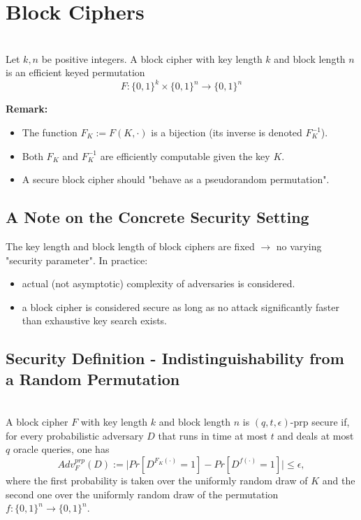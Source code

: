 

\chapter{Block Ciphers}


\begin{definition}\ \\
    Let $k,n$ be positive integers. A block cipher with key length $k$ and block length $n$ is an efficient keyed permutation 
    $$F: \{0,1\}^k \times \{0,1\}^n \to \{0,1\}^n$$
    
    \textbf{Remark:}
    \begin{itemize}
        \item The function $F_K := F(K,\cdot)$ is a bijection (its inverse is denoted $F_K^{-1}$).
        \item Both $F_K$ and $F_K^{-1}$ are efficiently computable given the key $K$.
        \item A secure block cipher should "behave as a pseudorandom permutation".
    \end{itemize}
\end{definition}


\section{A Note on the Concrete Security Setting}
	The key length and block length of block ciphers are fixed $\to$ no varying "security parameter". In practice:
	\begin{itemize}
	    \item actual (not asymptotic) complexity of adversaries is considered.
	    \item a block cipher is considered secure as long as no attack significantly faster than exhaustive key search exists.
	\end{itemize}


\section{Security Definition - Indistinguishability from a Random Permutation}
	\begin{definition}\ \\
	    A block cipher $F$ with key length $k$ and block length $n$ is $(q,t,\epsilon)$-prp secure if, for every probabilistic adversary $D$ 
	    that runs in time at most $t$ and deals at most $q$ oracle queries, one has
	    $$Adv_F^{prp}(D) := \vert Pr[D^{F_K(\cdot)}=1]-Pr[D^{f(\cdot)}=1] \vert \leq \epsilon,$$
	    where the first probability is taken over the uniformly random draw of $K$ and the second one over the uniformly random draw of the permutation $f: \{0,1\}^n \to \{0,1\}^n$.
	\end{definition}

